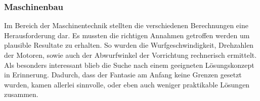 \subsubsection*{Maschinenbau}
Im Bereich der Maschinentechnik stellten die verschiedenen Berechnungen eine
Herausforderung dar. Es mussten die richtigen Annahmen getroffen werden um
plausible Resultate zu erhalten. So wurden die Wurfgeschwindigkeit,
Drehzahlen der Motoren, sowie auch der Abwurfwinkel der Vorrichtung
rechnerisch ermittelt.
Als besonders interessant blieb die Suche nach einem geeigneten
Lösungskonzept in Erinnerung. Dadurch, dass der Fantasie am Anfang keine
Grenzen gesetzt wurden, kamen allerlei sinnvolle, oder eben auch weniger
praktikable Lösungen zusammen.
